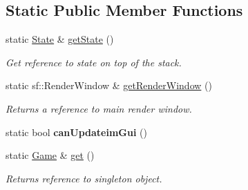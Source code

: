 \subsection*{Static Public Member Functions}
\begin{DoxyCompactItemize}
\item 
\hypertarget{classGame_aa742f626e4b8a5dac8677ef40263716c}{static \hyperlink{classState}{State} \& \hyperlink{classGame_aa742f626e4b8a5dac8677ef40263716c}{get\-State} ()}\label{classGame_aa742f626e4b8a5dac8677ef40263716c}

\begin{DoxyCompactList}\small\item\em Get reference to state on top of the stack. \end{DoxyCompactList}\item 
\hypertarget{classGame_ada9faa2a1f4e1453420adead02fd9865}{static sf\-::\-Render\-Window \& \hyperlink{classGame_ada9faa2a1f4e1453420adead02fd9865}{get\-Render\-Window} ()}\label{classGame_ada9faa2a1f4e1453420adead02fd9865}

\begin{DoxyCompactList}\small\item\em Returns a reference to main render window. \end{DoxyCompactList}\item 
\hypertarget{classGame_a25e2c45d98aa8c8cdddfc488854ad64e}{static bool {\bfseries can\-Updateim\-Gui} ()}\label{classGame_a25e2c45d98aa8c8cdddfc488854ad64e}

\item 
\hypertarget{classGame_ac69a0c5e25c7acb811f4a7b86a2ceb74}{static \hyperlink{classGame}{Game} \& \hyperlink{classGame_ac69a0c5e25c7acb811f4a7b86a2ceb74}{get} ()}\label{classGame_ac69a0c5e25c7acb811f4a7b86a2ceb74}

\begin{DoxyCompactList}\small\item\em Returns reference to singleton object. \end{DoxyCompactList}\end{DoxyCompactItemize}
